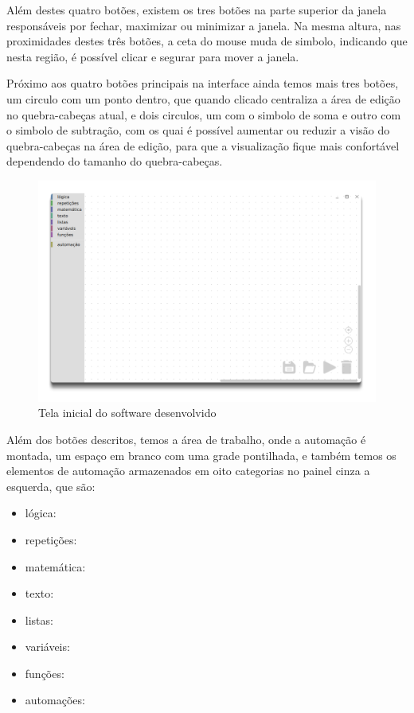 \documentclass[tg]{mdtufsm}
\begin{document}
                Além destes quatro botões, existem os tres botões na parte superior da janela responsáveis por fechar, maximizar ou minimizar a janela. Na mesma altura, nas proximidades destes três botões, a ceta do mouse muda de simbolo, indicando que nesta região, é possível clicar e segurar para mover a janela.

                Próximo aos quatro botões principais na interface ainda temos mais tres botões, um circulo com um ponto dentro, que quando clicado centraliza a área de edição no quebra-cabeças atual, e dois circulos, um com o simbolo de soma e outro com o simbolo de subtração, com os quai é possível aumentar ou reduzir a visão do quebra-cabeças na área de edição, para que a visualização fique mais confortável dependendo do tamanho do quebra-cabeças.

                \begin{figure}[!htb]
                    {\centering
                    \includegraphics[width=1.0\textwidth]{imagens/app.png}
                    \caption{Tela inicial do software desenvolvido}
                    \label{fig:app}}
                \end{figure}

                Além dos botões descritos, temos a área de trabalho, onde a automação é montada, um espaço em branco com uma grade pontilhada, e também temos os elementos de automação armazenados em oito categorias no painel cinza a esquerda, que são:

                \begin{itemize}
                    \item lógica:
                    \item repetições:
                    \item matemática:
                    \item texto:
                    \item listas:
                    \item variáveis:
                    \item funções:
                    \item automações:
                \end{itemize}
\end{document}
